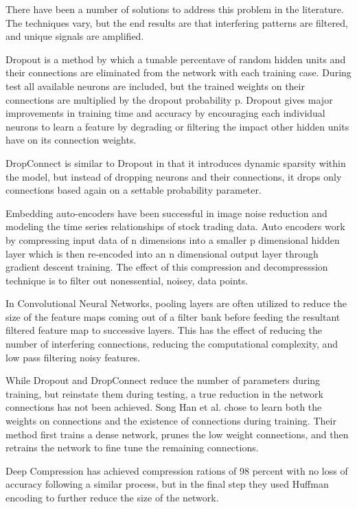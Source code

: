 \documentclass{llncs}
\begin{document}
There have been a number of solutions to address this problem in the literature.  The techniques vary, but the end results are that interfering patterns are filtered, and unique signals are amplified.

Dropout is a method by which a tunable percentave of random hidden units and their connections are eliminated from the network with each training case.  During test all available neurons are included, but the trained weights on their connections are multiplied by the dropout probability p.  Dropout gives major improvements in training time and accuracy by encouraging each individual neurons to learn a feature by degrading or filtering the impact other hidden units have on its connection weights.

DropConnect is similar to Dropout in that it introduces dynamic sparsity within the model, but instead of dropping neurons and their connections, it drops only connections based again on a settable probability parameter.

Embedding auto-encoders have been successful in image noise reduction and modeling the time series relationships of stock trading data.  Auto encoders work by compressing input data of n dimensions into a smaller p dimensional hidden layer which is then re-encoded into an n dimensional output layer through gradient descent training.  The effect of this compression and decompresssion technique is to filter out nonessential, noisey, data points.

In Convolutional Neural Networks,  pooling layers are often utilized to reduce the size of the feature maps coming out of a filter bank before feeding the resultant filtered feature map to successive layers.  This has the effect of reducing the number of interfering connections, reducing the computational complexity, and low pass filtering noisy features.

While Dropout and DropConnect reduce the number of parameters during training, but reinstate them during testing, a true reduction in the network connections has not been achieved.   Song Han et al. chose to learn both the weights on connections and the existence of connections during training. Their method first trains a dense network, prunes the low weight connections, and then retrains the network to fine tune the remaining connections.

Deep Compression has achieved compression rations of 98 percent with no loss of accuracy following a similar process, but in the final step they used Huffman encoding to further reduce the size of the network.
\end{document}
